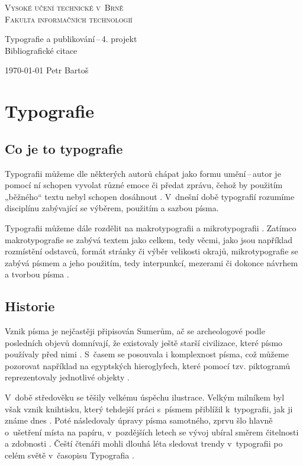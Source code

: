 \documentclass[11pt, a4paper, titlepage]{article}
\begin{document}
\begin{titlepage}
\begin{center}
{\Huge\textsc{
Vysoké učení technické v~Brně\\[0.4em]}}
{\huge\textsc{
Fakulta informačních technologií}}

{\LARGE
Typografie a publikování\,--\,4. projekt\\}
\Huge{Bibliografické citace}

{\Large
\today
\hfill
Petr Bartoš
}
\end{center}
\end{titlepage}

\section{Typografie}
\subsection{Co je to typografie}
Typografii můžeme dle některých autorů chápat jako formu umění\,--\,autor je pomocí ní schopen vyvolat různé emoce či předat zprávu, čehož by použitím „běžného“ textu nebyl schopen dosáhnout \cite{bringhurst2019}. V~dnešní době typografií rozumíme disciplínu zabývající se výběrem, použitím a sazbou písma. 

Typografii můžeme dále rozdělit na makrotypografii a mikrotypografii \cite{TypografieaText}. Zatímco makrotypografie se zabývá textem jako celkem, tedy věcmi, jako jsou například rozmístění odstavců, formát stránky či výběr velikosti okrajů, mikrotypografie se zabývá písmem a jeho použitím, tedy interpunkcí, mezerami či dokonce návrhem a tvorbou písma \cite{TypographicalCues}.  

\subsection{Historie}
Vznik písma je nejčastěji připisován Sumerům, ač se archeologové podle posledních objevů domnívají, že existovaly ještě starší civilizace, které písmo používaly před nimi \cite{Archaeology}. S~časem se posouvala i komplexnost písma, což můžeme pozorovat například na egyptských hieroglyfech, které pomocí tzv. piktogramů reprezentovaly jednotlivé objekty \cite{VACLAVKOVA2009}.

V~době středověku se těšily velkému úspěchu ilustrace. Velkým milníkem byl však vznik knihtisku, který tehdejší práci s~písmem přiblížil k~typografii, jak ji známe dnes \cite{DVORAKOVA2012}. Poté následovaly úpravy písma samotného, zprvu šlo hlavně o~ušetření místa na papíru, v~pozdějších letech se vývoj ubíral směrem čitelnosti a zdobnosti \cite{haley2012}. Čeští čtenáři mohli dlouhá léta sledovat trendy v~typografii po celém světě v~časopisu Typografia \cite{Typografia}. 
\end{document}
